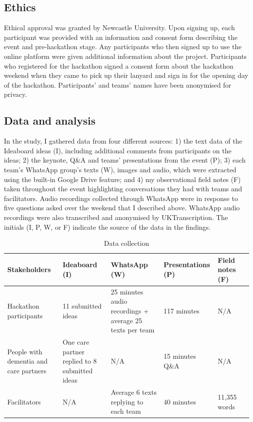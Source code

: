 \subsection{Ethics}
\label{sec:Ethics}
Ethical approval was granted by Newcastle University. Upon signing up, each participant was provided with an information and consent form describing the event and pre-hackathon stage. Any participants who then signed up to use the online platform were given additional information about the project. Participants who registered for the hackathon signed a consent form about the hackathon weekend when they came to pick up their lanyard and sign in for the opening day of the hackathon. Participants’ and teams' names have been anonymised for privacy.

\subsection{Data and analysis}
\label{sec:DataAnalysis}
In the study, I gathered data from four different sources: 1) the text data of the Ideaboard ideas (I), including additional comments from participants on the ideas; 2) the keynote, Q\&A and teams’ presentations from the event (P); 3) each team’s WhatsApp group’s texts (W), images and audio, which were extracted using the built-in Google Drive feature; and 4) my observational field notes (F) taken throughout the event highlighting conversations they had with teams and facilitators. Audio recordings collected through WhatsApp were in response to five questions asked over the weekend that I described above. WhatsApp audio recordings were also transcribed and anonymised by UKTranscription. The initials (I, P, W, or F) indicate the source of the data in the findings.

\begin{table}[ht]
\begin{tabularx}{\textwidth}{@{} Y|YYYYY @{}}
\textbf{Stakeholders} & \textbf{Ideaboard (I)} & \textbf{WhatsApp (W)} & \textbf{Presentations (P)} & \textbf{Field notes (F)} \\ \hline
Hackathon participants & 11 submitted ideas & 25 minutes audio recordings + average 25 texts per team & 117 minutes & N/A \\
People with dementia and care partners & One care partner replied to 8 submitted ideas & N/A & 15 minutes Q\&A & N/A \\
Facilitators & N/A & Average 6 texts replying to each team & 40 minutes & 11,355 words \\
\end{tabularx}
\caption{Data collection}
\label{table:data collection}
\end{table}


